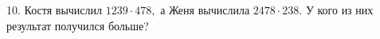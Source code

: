 10. Костя вычислил $1239\cdot 478,$ а Женя вычислила $2478\cdot238.$ У кого из них результат получился больше?\\
